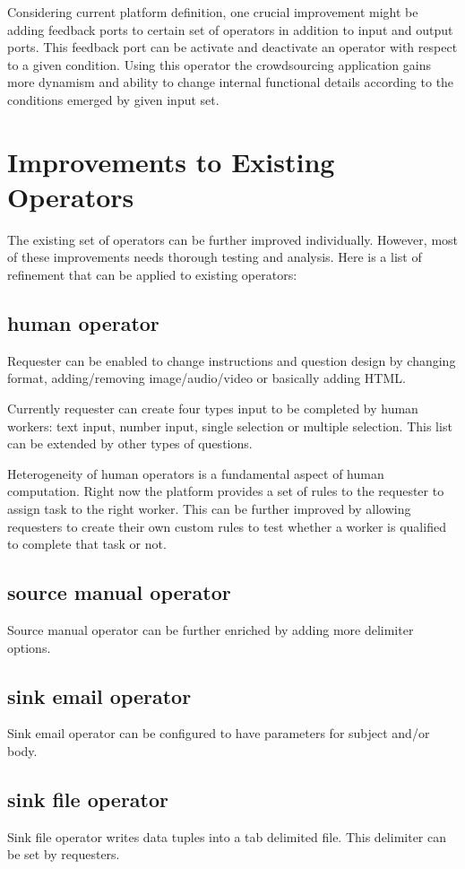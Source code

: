 Considering current platform definition, one crucial improvement might be adding feedback ports to certain set of operators in addition to input and output ports. This feedback port can be activate and deactivate an operator with respect to a given condition. Using this operator the crowdsourcing application gains more dynamism and ability to change internal functional details according to the conditions emerged by given input set.

\section{Improvements to Existing Operators}
The existing set of operators can be further improved individually. However, most of these improvements needs thorough testing and analysis. Here is a list of refinement that can be applied to existing operators: 

\subsection{human operator}
Requester can be enabled to change instructions and question design by changing format, adding/removing image/audio/video or basically adding HTML.

Currently requester can create four types input to be completed by human workers: text input, number input, single selection or multiple selection. This list can be extended by other types of questions.

Heterogeneity of human operators is a fundamental aspect of human computation. Right now the platform provides a set of rules to the requester to assign task to the right worker. This can be further improved by allowing requesters to create their own custom rules to test whether a worker is qualified to complete that task or not.

\subsection{source manual operator}
Source manual operator can be further enriched by adding more delimiter options.

\subsection{sink email operator}
Sink email operator can be configured to have parameters for subject and/or body.

\subsection{sink file operator}
Sink file operator writes data tuples into a tab delimited file. This delimiter can be set by requesters.

